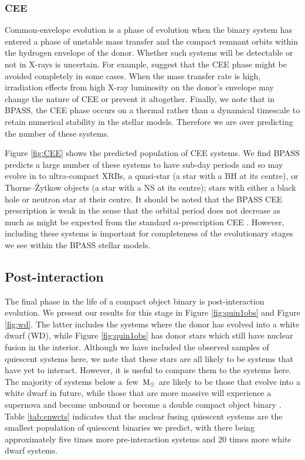 \documentclass{pas}
\begin{document}
\subsubsection{CEE}

Common-envelope evolution is a phase of evolution when the binary system has entered a phase of unstable mass transfer and the compact remnant orbits within the hydrogen envelope of the donor. Whether such systems will be detectable or not in X-rays is uncertain. For example, \citet{2007MNRAS.375.1000B} suggest that the CEE phase might be avoided completely in some cases. When the mass transfer rate is high, irradiation effects from high X-ray luminosity on the donor's envelope may change the nature of CEE or prevent it altogether. Finally, we note that in \textsc{BPASS}, the CEE phase occurs on a thermal rather than a dynamical timescale to retain numerical stability in the stellar models. Therefore we are over predicting the number of these systems.

Figure \ref{fig:CEE} shows the predicted population of CEE systems. We find \textsc{BPASS} predicts a large number of these systems to have sub-day periods and so may evolve in to ultra-compact XRBs, a quasi-star (a star with a BH at its centre), or Thorne–Żytkow objects (a star with a NS at its centre); stars with either a black hole or neutron star at their centre. It should be noted that the \textsc{BPASS} CEE prescription is weak in the sense that the orbital period does not decrease as much as might be expected from the standard $\alpha$-prescription CEE \citep[see supplementary information in ][for discussion on \textsc{BPASS} CEE]{2023NatAs...7..444S}. However, including these systems is important for completeness of the evolutionary stages we see within the \textsc{BPASS} stellar models.

\subsection{Post-interaction}
The final phase in the life of a compact object binary is post-interaction evolution. We present our results for this stage in Figure \ref{fig:quin1obs} and Figure \ref{fig:wd}. The latter includes the  systems where the donor has evolved into a white dwarf (WD), while Figure \ref{fig:quin1obs} has donor stars which still have nuclear fusion in the interior. Although we have included the observed samples of quiescent systems here, we note that these stars are all likely to be systems that have yet to interact. However, it is useful to compare them to the systems here. The majority of systems below a~few~${\rm M_{\odot}}$ are likely to be those that evolve into a white dwarf in future, while those that are more massive will experience a supernova and become unbound or become a double compact object binary \citep[again see][for predictions concerning these systems]{tang2024predictinggravitationalwavesignals}. Table \ref{tab:enwcts} indicates that the nuclear fusing quiescent systems are the smallest population of quiescent binaries we predict, with there being approximately five times more pre-interaction systems and 20 times more white dwarf systems.
\end{document}
